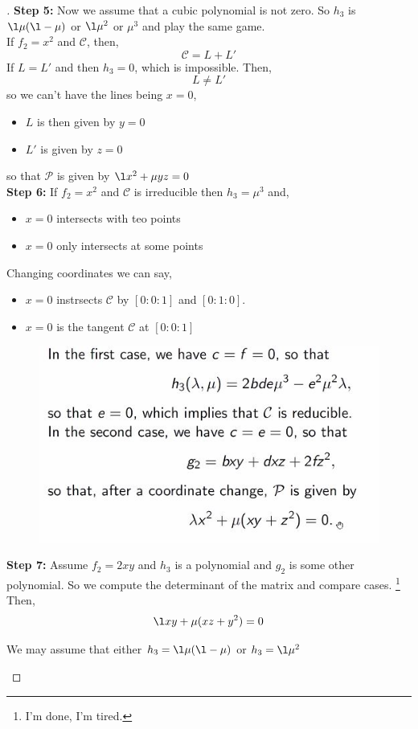 \documentclass{article}
\begin{document}
\begin{proof}[]
  \textbf{Step 5:} Now we assume that a cubic polynomial is not zero. So $h_3$ is $\l \mu (\l - \mu)$ or $\l \mu^2$ or $\mu^3$ and play the same game. \\
  If $f_2 = x^2$ and $\mathcal{C}$, then,
  $$ \mathcal{C} = L + L' $$
  If $L = L'$ and then $h_3 = 0$, which is impossible. Then,
  $$ L \ne L' $$
  so we can't have the lines being $x = 0$,
  \begin{itemize}
    \item $L$ is then given by $y = 0$
    \item $L'$ is given by $z = 0$
  \end{itemize}
  so that $\mathcal{P}$ is given by $\l x^2 + \mu yz = 0$\\
  \textbf{Step 6:} If $f_2 = x^2$ and $\mathcal{C}$ is irreducible then $h_3 = \mu^3$ and,
  \begin{itemize}
    \item $x= 0$ intersects with teo points
    \item $x = 0$ only intersects at some points
  \end{itemize}
  Changing coordinates we can say,
  \begin{itemize}
    \item $x = 0$ instrsects $\mathcal{C}$ by $[0 : 0 : 1]$ and $[0 : 1 :0]$.
    \item $x = 0$ is the tangent $\mathcal{C}$ at $[0 : 0 : 1]$
  \end{itemize}
  \begin{figure}[!ht]
  \centering
  \includegraphics{./figures/L4.3}
  \end{figure}
  \textbf{Step 7: }Assume $f_2 = 2xy$ and $h_3$ is a polynomial and $g_2$ is some other polynomial. So we compute the determinant of the matrix and compare cases. \footnote{ I'm done, I'm tired.}
  Then,
  $$ \l xy + \mu (xz + y^2) = 0 $$
  \begin{ncor}
     We may assume that either $h_3 = \l\mu (\l - \mu)$ or $h_3 = \l \mu^2$
  \end{ncor}


\end{proof}
\end{document}
